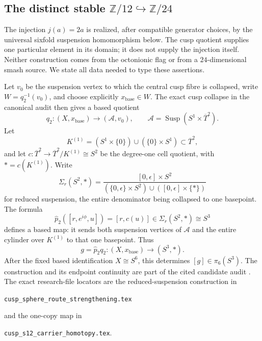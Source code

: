 \documentclass[11pt]{article}
\theoremstyle{definition}
\newcommand{\Z}{\mathbb Z}
\begin{document}
\subsection[The distinct stable mod--12-to-mod--24 injection]
{The distinct stable \(\Z/12\hookrightarrow\Z/24\)}

The injection \(j(a)=2a\) is realized, after compatible generator choices,
by the universal sixfold suspension homomorphism below.  The cusp quotient
supplies one particular element in its domain; it does not supply the
injection itself.  Neither construction comes from the octonionic flag or
from a \(24\)-dimensional smash source.  We state all data needed to type
these assertions.

Let \(v_0\) be the suspension vertex to which the central cusp fibre is
collapsed, write \(W=q_2^{-1}(v_0)\), and choose explicitly
\(x_{\mathrm{base}}\in W\).  The exact cusp collapse in the canonical audit
then gives a based quotient
\[
 q_2:(X,x_{\mathrm{base}})\longrightarrow
 (\mathcal A,v_0),\qquad
 \mathcal A=\operatorname{Susp}(S^1\times\overline T^2).
\]
Let
\[
 K^{(1)}=(S^1\times\{0\})\cup(\{0\}\times S^1)
 \subset\overline T^2,
\]
and let \(c:\overline T^2\to\overline T^2/K^{(1)}\cong S^2\) be the
degree-one cell quotient, with \(*=c(K^{(1)})\).  Write
\[
 \Sigma_r(S^2,*)=
 \frac{[0,\epsilon]\times S^2}
 { (\{0,\epsilon\}\times S^2)\cup([0,\epsilon]\times\{*\})}
\]
for reduced suspension, the entire denominator being collapsed to one
basepoint.  The formula
\[
 \widehat p_2([r,e^{i\phi},u])=[r,c(u)]
 \in\Sigma_r(S^2,*)\cong S^3
\]
defines a based map: it sends both suspension vertices of \(\mathcal A\)
and the entire cylinder over \(K^{(1)}\) to that one basepoint.  Thus
\begin{equation}
 g=\widehat p_2q_2:(X,x_{\mathrm{base}})\longrightarrow(S^3,*).
 \label{eq:one-copy-g}
\end{equation}
After the fixed based identification \(X\cong S^6\), this determines
\([g]\in\pi_6(S^3)\).  The construction and its endpoint continuity are
part of the cited candidate audit \cite{AlpogeS6_2026}.
The exact research-file locators are the reduced-suspension construction in
\begin{center}\small
\texttt{cusp\_sphere\_route\_strengthening.tex}
\end{center}
and the one-copy map in
\begin{center}\small
\texttt{cusp\_s12\_carrier\_homotopy.tex}.
\end{center}
\end{document}
